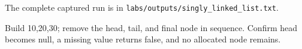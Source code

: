 The complete captured run is in \texttt{labs/outputs/singly\_linked\_list.txt}.

\begin{tryit}

Build 10,20,30; remove the head, tail, and final node in sequence. Confirm head becomes null, a missing value returns false, and no allocated node remains.

\end{tryit}
